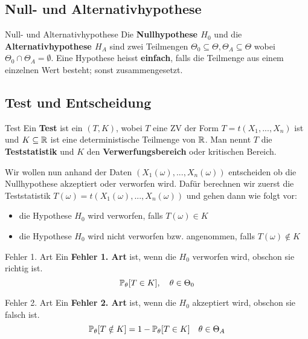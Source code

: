 \subsection{Null- und Alternativhypothese}

\begin{mainbox}{Null- und Alternativhypothese}
    Die \textbf{Nullhypothese $H_0$} und die \textbf{Alternativhypothese $H_A$} sind zwei Teilmengen $\Theta_0 \subseteq \Theta, \Theta_A \subseteq \Theta$ wobei $\Theta_0 \cap \Theta_A = \emptyset$. Eine Hypothese heisst \textbf{einfach}, falls die Teilmenge aus einem einzelnen Wert besteht; sonst zusammengesetzt.
\end{mainbox}


\subsection{Test und Entscheidung}

\begin{mainbox}{Test}
    Ein \textbf{Test} ist ein $(T, K)$, wobei $T$ eine ZV der Form $T = t(X_1,...,X_n)$ ist und $K \subseteq \mathbb{R}$ ist eine deterministische Teilmenge von $\mathbb{R}$. Man nennt $T$ die \textbf{Teststatistik} und $K$ den \textbf{Verwerfungsbereich} oder kritischen Bereich.
\end{mainbox}

Wir wollen nun anhand der Daten $(X_1(\omega), ..., X_n(\omega))$ entscheiden ob die Nullhypothese akzeptiert oder verworfen wird. Dafür berechnen wir zuerst die Teststatistik $T(\omega) = t(X_1(\omega), ..., X_n(\omega))$ und gehen dann wie folgt vor:
\begin{itemize}
    \item die Hypothese $H_0$ wird verworfen, falls $T(\omega) \in K$
    \item die Hypothese $H_0$ wird nicht verworfen bzw. angenommen, falls $T(\omega) \notin K$
\end{itemize}

\begin{subbox}{Fehler 1. Art}
    Ein \textbf{Fehler 1. Art} ist, wenn die $H_0$ verworfen wird, obschon sie richtig ist.
    $$\mathbb{P}_\theta[T \in K], \quad \theta \in \Theta_0$$
\end{subbox}


\begin{subbox}{Fehler 2. Art}
    Ein \textbf{Fehler 2. Art} ist, wenn die $H_0$ akzeptiert wird, obschon sie falsch ist.
    $$\mathbb{P}_\theta[T \notin K] = 1 - \mathbb{P}_\theta [T \in K] \quad \theta \in \Theta_A$$

\end{subbox}


